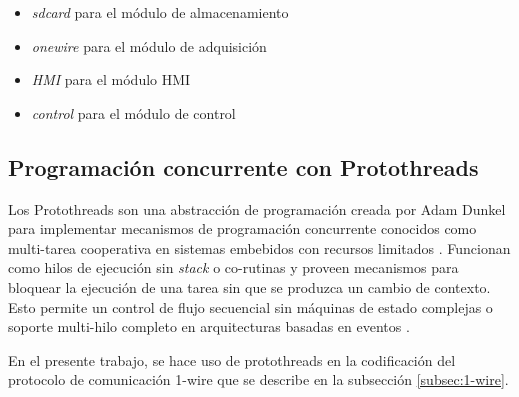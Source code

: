 \begin{itemize}
	\item \textit{sdcard} para el módulo de almacenamiento
	\item \textit{onewire} para el módulo de adquisición
	\item \textit{HMI} para el módulo HMI
	\item \textit{control} para el módulo de control
\end{itemize}  



\subsection{Programación concurrente con Protothreads} 
\label{subsec:protothreads}

Los Protothreads son una abstracción de programación creada por Adam Dunkel para implementar mecanismos de programación concurrente conocidos como multi-tarea cooperativa en sistemas embebidos con recursos limitados \citep{Protothreads}. Funcionan como hilos de ejecución sin \textit{stack} o co-rutinas y proveen mecanismos para bloquear la ejecución de una tarea sin que se produzca un cambio de contexto.  Esto permite un control de flujo secuencial sin máquinas de estado complejas o soporte multi-hilo completo en arquitecturas basadas en eventos \citep{dunkels06protothreads} \citep{dunkels05using}. 

En el presente trabajo, se hace uso de protothreads en la codificación del protocolo de comunicación 1-wire que se describe en la subsección \ref{subsec:1-wire}.